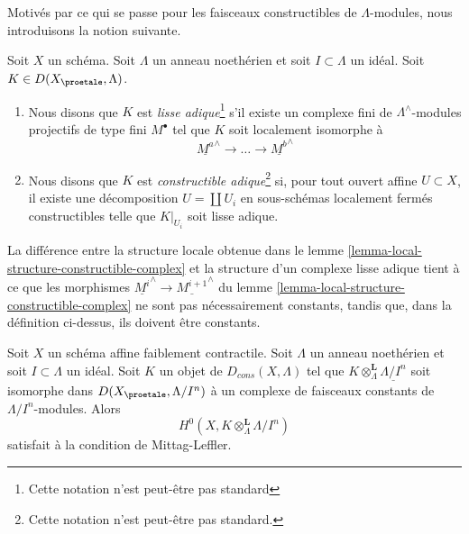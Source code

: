 \noindent
Motivés par ce qui se passe pour les faisceaux constructibles de $\Lambda$-modules,
nous introduisons la notion suivante.

\begin{definition}
\label{definition-adic-constructible}
Soit $X$ un schéma. Soit $\Lambda$ un anneau noethérien et soit
$I \subset \Lambda$ un idéal. Soit $K \in D(X_\proetale, \Lambda)$.
\begin{enumerate}
\item Nous disons que $K$ est {\it lisse adique}\footnote{Cette notation n'est peut-être
pas standard} s'il existe un complexe fini de
$\Lambda^\wedge$-modules projectifs de type fini $M^\bullet$ tel que
$K$ soit localement isomorphe à
$$
\underline{M^a}^\wedge \to \ldots \to \underline{M^b}^\wedge
$$
\item Nous disons que $K$ est {\it constructible adique}\footnote{Cette notation n'est peut-être
pas standard.} si, pour tout ouvert affine $U \subset X$,
il existe une décomposition $U = \coprod U_i$ en
sous-schémas localement fermés constructibles telle que $K|_{U_i}$
soit lisse adique.
\end{enumerate}
\end{definition}

\noindent
La différence entre la structure locale obtenue dans le
lemme \ref{lemma-local-structure-constructible-complex}
et la structure d'un complexe lisse adique tient à ce que
les morphismes $\underline{M^i}^\wedge \to \underline{M^{i + 1}}^\wedge$ du
lemme \ref{lemma-local-structure-constructible-complex}
ne sont pas nécessairement constants, tandis que, dans la définition ci-dessus, ils
doivent être constants.

\begin{lemma}
\label{lemma-weakly-contractible-locally-constant-ML}
Soit $X$ un schéma affine faiblement contractile. Soit $\Lambda$ un
anneau noethérien et soit $I \subset \Lambda$ un idéal. Soit $K$ un objet de
$D_{cons}(X, \Lambda)$ tel que
$K \otimes_\Lambda^\mathbf{L} \underline{\Lambda/I^n}$
soit isomorphe dans $D(X_\proetale, \Lambda/I^n)$ à un
complexe de faisceaux constants de $\Lambda/I^n$-modules. Alors
$$
H^0(X, K \otimes_\Lambda^\mathbf{L} \Lambda/I^n)
$$
satisfait à la condition de Mittag-Leffler.
\end{lemma}

